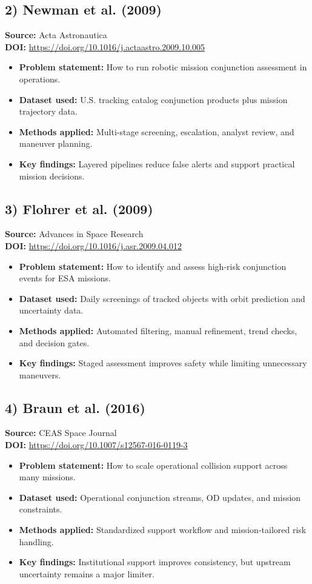 \documentclass[11pt]{article}
\begin{document}
\subsection*{2) Newman et al. (2009)}
\textbf{Source:} Acta Astronautica \\
\textbf{DOI:} \url{https://doi.org/10.1016/j.actaastro.2009.10.005}
\begin{itemize}[noitemsep]
    \item \textbf{Problem statement:} How to run robotic mission conjunction assessment in operations.
    \item \textbf{Dataset used:} U.S. tracking catalog conjunction products plus mission trajectory data.
    \item \textbf{Methods applied:} Multi-stage screening, escalation, analyst review, and maneuver planning.
    \item \textbf{Key findings:} Layered pipelines reduce false alerts and support practical mission decisions.
\end{itemize}

\subsection*{3) Flohrer et al. (2009)}
\textbf{Source:} Advances in Space Research \\
\textbf{DOI:} \url{https://doi.org/10.1016/j.asr.2009.04.012}
\begin{itemize}[noitemsep]
    \item \textbf{Problem statement:} How to identify and assess high-risk conjunction events for ESA missions.
    \item \textbf{Dataset used:} Daily screenings of tracked objects with orbit prediction and uncertainty data.
    \item \textbf{Methods applied:} Automated filtering, manual refinement, trend checks, and decision gates.
    \item \textbf{Key findings:} Staged assessment improves safety while limiting unnecessary maneuvers.
\end{itemize}

\subsection*{4) Braun et al. (2016)}
\textbf{Source:} CEAS Space Journal \\
\textbf{DOI:} \url{https://doi.org/10.1007/s12567-016-0119-3}
\begin{itemize}[noitemsep]
    \item \textbf{Problem statement:} How to scale operational collision support across many missions.
    \item \textbf{Dataset used:} Operational conjunction streams, OD updates, and mission constraints.
    \item \textbf{Methods applied:} Standardized support workflow and mission-tailored risk handling.
    \item \textbf{Key findings:} Institutional support improves consistency, but upstream uncertainty remains a major limiter.
\end{itemize}
\end{document}
